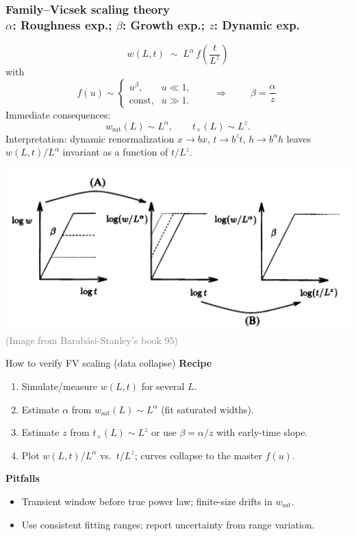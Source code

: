 \documentclass[9pt,table,xcolor=dvipsnames]{beamer}
\begin{document}
\begin{frame}[t]
   \frametitle{Family--Vicsek scaling theory \\ 
   \small $\alpha$: Roughness exp.; $\beta$: Growth exp.; $z$: Dynamic exp.}
   \small
  \[
    \boxed{\;w(L,t)\;\sim\; L^{\alpha}\, f\!\left(\dfrac{t}{L^{z}}\right)\;}
  \]
  with
  \[
  f(u)\sim 
  \begin{cases}
  u^{\beta}, & u\ll1,\\[2pt]
  \text{const}, & u\gg1.
  \end{cases}
  \qquad\Rightarrow\qquad
  \boxed{\;\beta=\dfrac{\alpha}{z}\;}
  \]
  Immediate consequences:
  \[
    w_{\mathrm{sat}}(L) \sim L^{\alpha},\qquad
    t_\times(L)\sim L^{z}.
  \]
  Interpretation: dynamic renormalization $x\!\to\! b x$, $t\!\to\! b^{z}t$,
  $h\!\to\! b^{\alpha}h$ leaves $w(L,t)/L^{\alpha}$ invariant as a function of
  $t/L^{z}$.

  \vfill
  \begin{center}
    \includegraphics[width=0.6\linewidth]{./figs/FV.png} \\

    {\footnotesize \textcolor{gray}{(Image from Barab\'asi-Stanley's book 95)}}
  \end{center}

\end{frame}

\begin{frame}[t]{How to verify FV scaling (data collapse)}
\small
\textbf{Recipe}
\begin{enumerate}\itemsep2pt
\item Simulate/measure $w(L,t)$ for several $L$.
\item Estimate $\alpha$ from $w_{\mathrm{sat}}(L)\!\sim\! L^{\alpha}$ (fit saturated widths).
\item Estimate $z$ from $t_\times(L)\!\sim\! L^{z}$ or use $\beta=\alpha/z$ with early-time slope.
\item Plot $w(L,t)/L^{\alpha}$ vs.\ $t/L^{z}$; curves collapse to the master $f(u)$.
\end{enumerate}
\textbf{Pitfalls}
\begin{itemize}\itemsep2pt
\item Transient window before true power law; finite-size drifts in $w_{\mathrm{sat}}$.
\item Use consistent fitting ranges; report uncertainty from range variation.
\end{itemize}
\end{frame}
\end{document}
